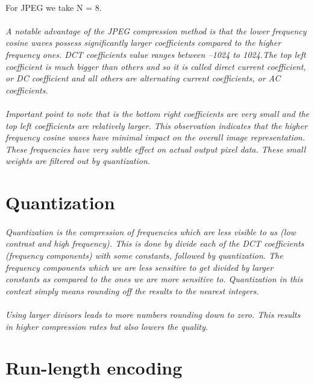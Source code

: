 \documentclass[12pt, letterpaper]{article}
\begin{document}
\paragraph{}For JPEG we take N = 8.
\paragraph{}\textit{A notable advantage of the JPEG compression method is that the lower frequency cosine waves possess significantly larger coefficients compared to the higher frequency ones. DCT coefficients value ranges between –1024 to 1024.The top left coefficient is much bigger than others and so it is called direct current coefficient, or DC coefficient and all others are alternating current coefficients, or AC coefficients. }
\paragraph{}\textit{Important point to note that is the bottom right coefficients are very small and the top left coefficients are relatively larger. This observation indicates that the higher frequency cosine waves have minimal impact on the overall image representation. These frequencies have very subtle effect on actual output pixel data. These small weights are filtered out by quantization.}
\section{{\color{blue}Quantization}}
\paragraph{}\textit{Quantization is the compression of frequencies which are less visible to us (low contrast and high frequency). This is done by divide each of the DCT coefficients (frequency components) with some constants, followed by quantization. The frequency components which we are less sensitive to get divided by larger constants as compared to the ones we are more sensitive to. Quantization in this context simply means rounding off the results to the nearest integers.}
\paragraph{}\textit{Using larger divisors leads to more numbers rounding down to zero. This results in higher compression rates but also lowers the quality. }
\section{{\color{blue}Run-length encoding}}
\end{document}
